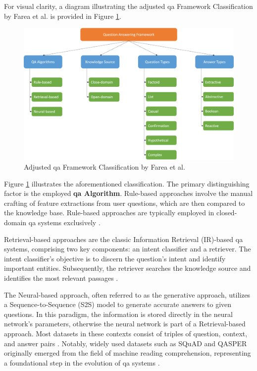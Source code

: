 For visual clarity, a diagram illustrating the adjusted \gls{qa} Framework Classification by Farea et al. is provided in Figure \ref{fig:qa_classification}.

\begin{figure}[h]
    \centering
    \includegraphics[width=\textwidth]{Grafiken/QA_Framework.png}
    \caption{Adjusted \gls{qa} Framework Classification by Farea et al. \cite{farea_evaluation_2022}}
    \label{fig:qa_classification}
\end{figure}


Figure \ref{fig:qa_classification} illustrates the aforementioned classification. The primary distinguishing factor is the employed \textbf{\gls{qa} Algorithm}. Rule-based approaches involve the manual crafting of feature extractions from user questions, which are then compared to the knowledge base. Rule-based approaches are typically employed in closed-domain \gls{qa} systems exclusively \cite{etezadi_state_2023}.

Retrieval-based approaches are the classic Information Retrieval (IR)-based \gls{qa} systems, comprising two key components: an intent classifier and a retriever. The intent classifier's objective is to discern the question's intent and identify important entities. Subsequently, the retriever searches the knowledge source and identifies the most relevant passages \cite{farea_evaluation_2022, zhu_retrieving_2021}.

The Neural-based approach, often referred to as the generative approach, utilizes a Sequence-to-Sequence (S2S) model to generate accurate answers to given questions. In this paradigm, the information is stored directly in the neural network's parameters, otherwise the neural network is part of a Retrieval-based approach. Most datasets in these contexts consist of triples of question, context, and answer pairs \cite{jurafsky_speech_2023}. Notably, widely used datasets such as SQuAD and QASPER originally emerged from the field of machine reading comprehension, representing a foundational step in the evolution of \gls{qa} systems \cite{rajpurkar_squad_2016, dasigi_dataset_2021, zhu_retrieving_2021}.

